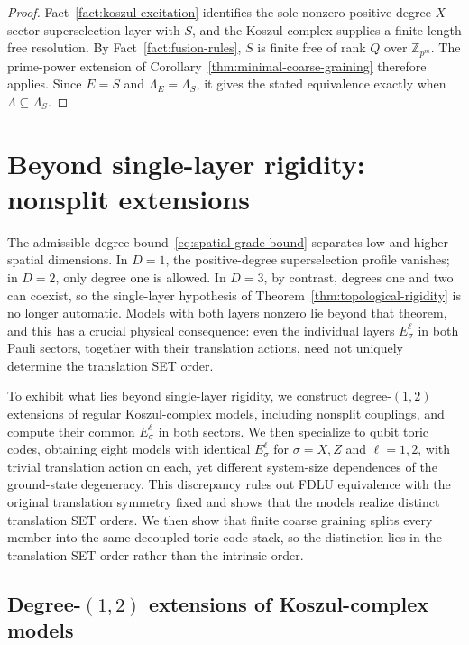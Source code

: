 \documentclass[aps,prx,english,superscriptaddress,twocolumn,tightenlines,showpacs,longbibliography,floatfix,amsfonts]{revtex4-2}
\theoremstyle{remark}
\theoremstyle{definition}
\begin{document}
\begin{proof}
	Fact~\ref{fact:koszul-excitation} identifies the sole nonzero
	positive-degree \(X\)-sector superselection layer with \(S\), and the
	Koszul complex supplies a finite-length free resolution. By
	Fact~\ref{fact:fusion-rules}, \(S\) is finite free of rank \(Q\) over
	\(\mathbb Z_{p^m}\). The prime-power extension of
	Corollary~\ref{thm:minimal-coarse-graining} therefore applies. Since
	\(E=S\) and \(\Lambda_E=\Lambda_S\), it gives the stated equivalence exactly
	when \(\Lambda\subseteq\Lambda_S\).
\end{proof}


\section{Beyond single-layer rigidity: nonsplit extensions}
\label{sec:non-splitting-extensions}

The admissible-degree bound~\eqref{eq:spatial-grade-bound} separates low and
higher spatial dimensions.  In \(D=1\), the positive-degree superselection
profile vanishes; in \(D=2\), only degree one is allowed. In \(D=3\), by
contrast, degrees one and two can coexist, so the single-layer hypothesis of
Theorem~\ref{thm:topological-rigidity} is no longer automatic. Models with
both layers nonzero lie beyond that theorem, and this has a crucial physical
consequence: even the individual layers \(E_\sigma^\ell\) in both Pauli
sectors, together with their translation actions, need not uniquely determine
the translation SET order.

To exhibit what lies beyond single-layer rigidity, we construct
degree-\((1,2)\) extensions of regular Koszul-complex models, including
nonsplit couplings, and compute their common \(E_\sigma^\ell\) in both
sectors. We then specialize to qubit toric codes, obtaining eight models with
identical \(E_\sigma^\ell\) for \(\sigma=X,Z\) and \(\ell=1,2\), with trivial
translation action on each,
yet different system-size dependences of the ground-state degeneracy.  This
discrepancy rules out FDLU equivalence with the original translation symmetry
fixed and shows that the models realize distinct translation SET orders. We
then show that finite coarse graining splits every member into
the same decoupled toric-code stack, so the distinction lies in the translation
SET order rather than the intrinsic order.

\subsection{Degree-\((1,2)\) extensions of Koszul-complex models}
\end{document}
